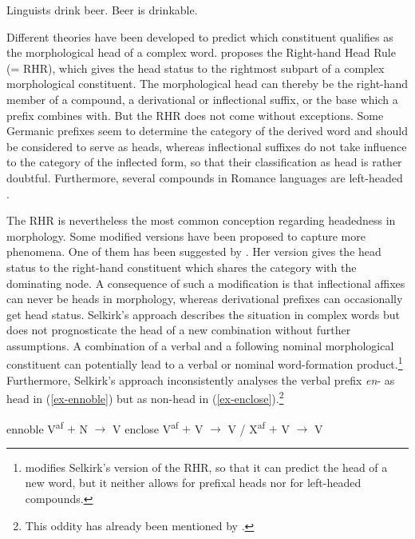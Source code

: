 \documentclass[output=paper
  ,nobabel
  ,draftmode
  ,colorlinks, citecolor=brown
]{langscibook}
\begin{document}
\eal\label{ex-beer}
\ex Linguists drink beer.
\ex Beer is drinkable. 
\zl

\noindent Different theories have been developed to predict which constituent qualifies as the morphological head of a complex word. \citet{Williams1981} proposes the Right-hand Head Rule (= RHR), which gives the head status to the rightmost subpart of a complex morphological constituent. The morphological head can thereby be the right-hand member of a compound, a derivational or inflectional suffix, or the base which a prefix combines with. But the RHR does not come without exceptions. Some Germanic prefixes seem to determine the category of the derived word and should be considered to serve as heads, whereas inflectional suffixes do not take influence to the category of the inflected form, so that their classification as head is rather doubtful. Furthermore, several compounds in Romance languages are left-headed \citep[cf. e.g.][Section~5]{Scalise1988}.

\largerpage[2]
The RHR is nevertheless the most common conception regarding headedness in morphology. Some modified versions have been proposed to capture more phenomena. One of them has been suggested by \citet{Selkirk1982}. Her version gives the head status to the right-hand constituent which shares the category with the dominating node. A consequence of such a modification is that inflectional affixes can never be heads in morphology, whereas derivational prefixes can occasionally get head status. Selkirk's approach describes the situation in complex words but does not prognosticate the head of a new combination without further assumptions. A combination of a verbal and a following nominal morphological constituent can potentially lead to a verbal or nominal word-formation product.\footnote{\citet{Olsen1990} modifies Selkirk's version of the RHR, so that it can predict the head of a new word, but it neither allows for prefixal heads nor for left-headed compounds.}   Furthermore, Selkirk's approach inconsistently analyses the verbal prefix \emph{en}- as head in (\ref{ex-ennoble}) but as non-head in (\ref{ex-enclose}).\footnote{This oddity has already been mentioned by \citet[167]{TrommelenZonneveld1986}.}

\eal
\ex\label{ex-ennoble}
ennoble \hspace{48pt} V\textsuperscript{af} $+$ N $\rightarrow$ V
\ex\label{ex-enclose} enclose  \hspace{50pt} V\textsuperscript{af} $+$ V $\rightarrow$ V / X\textsuperscript{af} $+$ V $\rightarrow$ V
\zl
\end{document}
